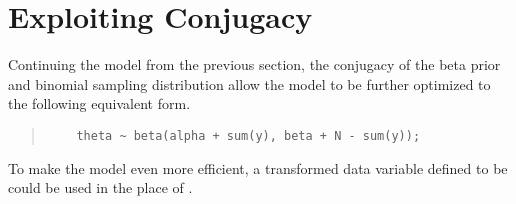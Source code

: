 \section{Exploiting Conjugacy}


Continuing the model from the previous section, the conjugacy of the
beta prior and binomial sampling distribution allow the model to be
further optimized to the following equivalent form.
%
\begin{quote}
\begin{Verbatim}
    theta ~ beta(alpha + sum(y), beta + N - sum(y));
\end{Verbatim}
\end{quote}
%
To make the model even more efficient, a transformed data variable
defined to be  could be used in the place of .



